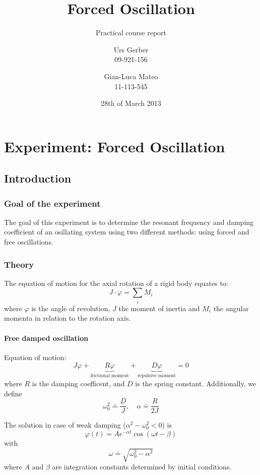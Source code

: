 \documentclass{scrreprt}
\author{Urs Gerber\\09-921-156 \and Gian-Luca Mateo\\11-113-545}
\date{28th of March 2013}
\title{Forced Oscillation}
\subtitle{Practical course report}
\renewcommand{\phi}{\varphi}
\begin{document}
\maketitle

\tableofcontents
\newpage

\chapter{Experiment: Forced Oscillation}
\section{Introduction}
\subsection{Goal of the experiment}
The goal of this experiment is to determine the resonant frequency and damping coefficient of an osillating system using two different methods: using forced and free oscillations.

\subsection{Theory}
The equation of motion for the axial rotation of a rigid body equates to:
\begin{equation}
J\cdot \ddot{\phi} = \sum_i M_i
\end{equation}
where $\phi$ is the angle of revolution, $J$ the moment of inertia and $M_i$ the angular momenta in relation to the rotation axis.

\subsubsection{Free damped oscillation}
Equation of motion:
\begin{equation}
J\ddot{\phi} + \underbrace{R \dot{\phi}}_{\text{frictional moment}} + \underbrace{D \phi}_{\text{repulsive moment}} = 0
\end{equation}
where $R$ is the damping coefficent, and $D$ is the spring constant. Additionally, we define
\begin{equation}
\omega_0^2 \doteq \frac{D}{J}, \quad \alpha \doteq \frac{R}{2J}
\end{equation}

The solution in case of weak damping ($\alpha^2 - \omega_0^2 < 0$) is
\begin{equation}
\phi(t) = A e^{-\alpha t} \cos{\left(\omega t - \beta\right)} \label{eq:freedampedsolution}
\end{equation}
with
\begin{equation} 
\omega \doteq \sqrt{\omega_0^2-\alpha^2}
\label{omega0}
\end{equation}
where $A$ and $\beta$ are integration constants determined by initial conditions.
\end{document}
